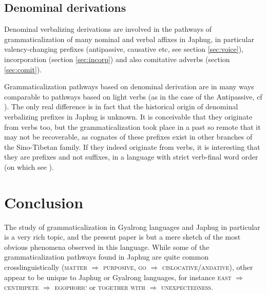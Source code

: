\documentclass[oneside,a4paper,11pt]{article}
\begin{document}
\subsection{Denominal derivations} \label{sec:denom}
Denominal verbalizing derivations are involved in the pathways of grammaticalization of many nominal and verbal affixes in Japhug, in particular valency-changing prefixes (antipassive, causative etc, see section \ref{sec:voice}), incorporation (section \ref{sec:incorp}) and also comitative adverbs (section \ref{sec:comit}).

Grammaticalization pathways based on denominal derivation are in many ways comparable to pathways  based on light verbs (as in the case of the Antipassive, cf \citealt{creissels12antip}). The only real  difference is in fact that the historical origin of denominal verbalizing prefixes in Japhug is unknown. It is conceivable that they originate from verbs too, but the grammaticalization took place in a past so remote that it may not be recoverable, as cognates of these prefixes exist in other branches of the Sino-Tibetan family. If they indeed originate from verbs, it is interesting that they are prefixes and not suffixes, in a language with strict verb-final word order (on which see \citealt{jacques13harmonization}).  
 

\section{Conclusion} 
The study of grammaticalization in Gyalrong languages and Japhug in particular is a very rich topic, and the present paper is but a mere sketch of the most obvious phenomena observed in this language. While some of the grammaticalization pathways found in Japhug are quite common crosslinguistically (\textsc{matter} $\Rightarrow$ \textsc{purposive}, \textsc{go} $\Rightarrow$ \textsc{cislocative/andative}), other appear to be unique to Japhug or Gyalrong languages, for instance \textsc{east} $\Rightarrow$ \textsc{centripete} $\Rightarrow$ \textsc{egophoric} or \textsc{together with} $\Rightarrow$ \textsc{unexpectedness}.




\end{document}
